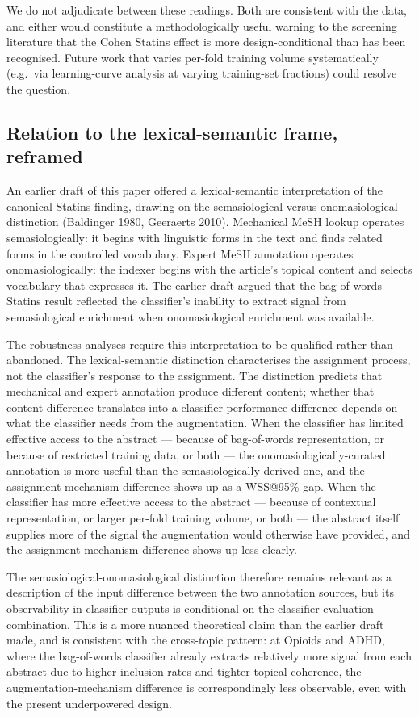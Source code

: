 \documentclass[11pt,a4paper]{article}
\begin{document}
We do not adjudicate between these readings. Both are consistent with the data, and either would constitute a methodologically useful warning to the screening literature that the Cohen Statins effect is more design-conditional than has been recognised. Future work that varies per-fold training volume systematically (e.g.\ via learning-curve analysis at varying training-set fractions) could resolve the question.

\subsection{Relation to the lexical-semantic frame, reframed}

An earlier draft of this paper offered a lexical-semantic interpretation of the canonical Statins finding, drawing on the semasiological versus onomasiological distinction (Baldinger 1980, Geeraerts 2010). Mechanical MeSH lookup operates semasiologically: it begins with linguistic forms in the text and finds related forms in the controlled vocabulary. Expert MeSH annotation operates onomasiologically: the indexer begins with the article's topical content and selects vocabulary that expresses it. The earlier draft argued that the bag-of-words Statins result reflected the classifier's inability to extract signal from semasiological enrichment when onomasiological enrichment was available.

The robustness analyses require this interpretation to be qualified rather than abandoned. The lexical-semantic distinction characterises the assignment process, not the classifier's response to the assignment. The distinction predicts that mechanical and expert annotation produce different content; whether that content difference translates into a classifier-performance difference depends on what the classifier needs from the augmentation. When the classifier has limited effective access to the abstract --- because of bag-of-words representation, or because of restricted training data, or both --- the onomasiologically-curated annotation is more useful than the semasiologically-derived one, and the assignment-mechanism difference shows up as a WSS@95\% gap. When the classifier has more effective access to the abstract --- because of contextual representation, or larger per-fold training volume, or both --- the abstract itself supplies more of the signal the augmentation would otherwise have provided, and the assignment-mechanism difference shows up less clearly.

The semasiological-onomasiological distinction therefore remains relevant as a description of the input difference between the two annotation sources, but its observability in classifier outputs is conditional on the classifier-evaluation combination. This is a more nuanced theoretical claim than the earlier draft made, and is consistent with the cross-topic pattern: at Opioids and ADHD, where the bag-of-words classifier already extracts relatively more signal from each abstract due to higher inclusion rates and tighter topical coherence, the augmentation-mechanism difference is correspondingly less observable, even with the present underpowered design.
\end{document}
